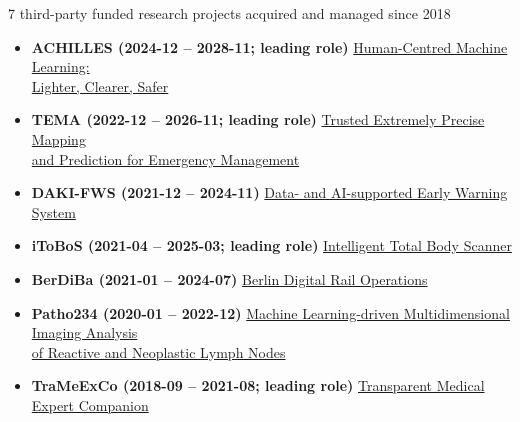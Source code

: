 
\ifdefined\shortcv
    {\hspace*{\fill} 7 third-party funded research projects acquired and managed since 2018}
\else
    \begin{itemize}
        \item [] \textbf{ACHILLES (2024-12 -- 2028-11; leading role)}
                \href{https://www.hhi.fraunhofer.de/en/departments/ai/projects/achilles.html}{
                    \hspace*{\fill} Human-Centred Machine Learning:\\
                    \hspace*{\fill}   Lighter, Clearer, Safer}

        \item [] \textbf{TEMA (2022-12 -- 2026-11; leading role)}
                \href{https://www.hhi.fraunhofer.de/en/departments/ai/projects/tema.html}{
                    \hspace*{\fill} Trusted Extremely Precise Mapping\\
                    \hspace*{\fill}  and Prediction for Emergency Management}

        \item [] \textbf{DAKI-FWS (2021-12 -- 2024-11)}
                \href{https://www.hhi.fraunhofer.de/en/departments/ai/projects/daki-fws.html}{\hspace*{\fill} Data- and AI-supported Early Warning System}
    
        \item [] \textbf{iToBoS (2021-04 -- 2025-03; leading role)}
                \href{https://www.hhi.fraunhofer.de/en/departments/ai/projects/itobos.html}{\hspace*{\fill} Intelligent Total Body Scanner}

        \item [] \textbf{BerDiBa (2021-01 -- 2024-07)}
                \href{https://www.hhi.fraunhofer.de/en/departments/ai/projects/berdiba.html}{\hspace*{\fill} Berlin Digital Rail Operations}


        \item [] \textbf{Patho234 (2020-01 -- 2022-12)}
                \href{https://www.hhi.fraunhofer.de/en/departments/ai/projects/patho234.html}{
                    \hspace*{\fill} Machine Learning-driven Multidimensional Imaging Analysis\\
                    \hspace*{\fill} of Reactive  and Neoplastic Lymph Nodes}

        \item [] \textbf{TraMeExCo (2018-09 -- 2021-08; leading role)}
                \href{https://www.hhi.fraunhofer.de/en/departments/ai/projects/trameexco.html}{\hspace*{\fill}Transparent Medical Expert Companion}

    \end{itemize}
\fi